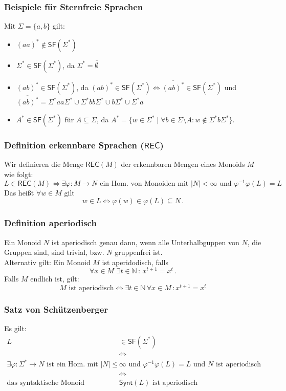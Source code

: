 \documentclass[12pt, german]{article}
\newcommand{\N}{\mathbb{N}}
\newcommand{\sigstern}{\Sigma^\ast}
\newcommand{\inv}{^{-1}}
\newcommand{\rec}{\mathsf{REC}}
\newcommand{\starfree}{\mathsf{SF}}
\newcommand{\synt}{\mathsf{Synt}}
\begin{document}
	\subsubsection{Beispiele für Sternfreie Sprachen}
	Mit $\Sigma = \{a,b\}$ gilt:
	\begin{itemize}
		\item $(aa)^\ast \not\in \starfree(\sigstern)$
				\item $\sigstern \in \starfree(\sigstern)$, da $\sigstern = \overline{\emptyset}$
		\item $(ab)^\ast \in \starfree(\sigstern)$, da $(ab)^\ast \in \starfree(\sigstern) \iff \overline{(ab)^\ast}\in \starfree(\sigstern)$ und $\overline{(ab)^\ast} = \sigstern aa \sigstern \cup \sigstern bb \sigstern \cup b\sigstern \cup \sigstern a$
		\item $A^\ast \in \starfree(\sigstern)$ für $A\subseteq \Sigma$, da $A^\ast = \{ w \in \sigstern \mid \forall b \in \Sigma \setminus A : w \notin \sigstern b\sigstern\}$.
	\end{itemize}
	
	
	
	\subsubsection{Definition erkennbare Sprachen ($\rec$)}
	\label{sec:rec}
	Wir definieren die Menge $\rec(M)$ der erkennbaren Mengen eines Monoids $M$ wie folgt:  $$L \in \rec(M) \iff \exists \varphi : M \to N \text{ ein Hom. von Monoiden mit } |N| < \infty \text{ und } \varphi\inv\varphi(L) = L$$
	Das hei\ss t $\forall w \in M$ gilt $$w\in L \iff \varphi(w) \in \varphi(L) \subseteq N\, .$$
	
	\subsubsection{Definition aperiodisch}
	Ein Monoid $N$ ist aperiodisch genau dann, wenn alle Unterhalbguppen von $N$, die Gruppen sind, sind trivial, bzw. $N$ gruppenfrei ist.\\
	Alternativ gilt: Ein Monoid $M$	ist aperidodisch, falls $$\forall x \in M\,\,\exists t \in \N \, : \, x^{t+1} = x^t \, .$$
	Falls $M$ endlich ist, gilt: $$M \text{ ist aperiodisch} \iff \exists t \in \N\, \forall x \in M \, : x^{t+1} = x^t$$
	
	
	\subsubsection{Satz von Schützenberger}
	Es gilt: 
	\begin{align*}
		L &\in \starfree(\sigstern)\\
		&\iff \\
		\exists \varphi: \sigstern \to N \text{ ist ein Hom. mit } |N| \leq &\infty \text{ und } \varphi\inv\varphi(L) = L \text{ und $N$ ist aperiodisch} \\ 
		&\iff \\
		\text{das syntaktische Monoid } &\synt(L) \text{ ist aperiodisch}
	\end{align*}
	
\end{document}
